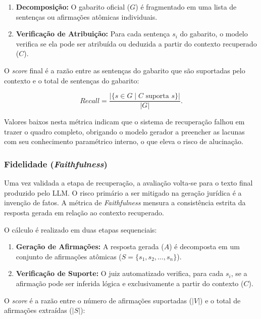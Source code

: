 \begin{enumerate}
  \item \textbf{Decomposição:} O gabarito oficial ($G$) é fragmentado em uma lista de sentenças ou afirmações atômicas individuais.
  \item \textbf{Verificação de Atribuição:} Para cada sentença $s_i$ do gabarito, o modelo verifica se ela pode ser atribuída ou deduzida a partir do contexto recuperado ($C$).
\end{enumerate}

O \textit{score} final é a razão entre as sentenças do gabarito que são suportadas pelo contexto e o total de sentenças do gabarito:

\begin{equation}
  Recall = \frac{|\{s \in G \mid C \text{ suporta } s\}|}{|G|}.
\end{equation}

Valores baixos nesta métrica indicam que o sistema de recuperação falhou em trazer o quadro completo, obrigando o modelo gerador a preencher as lacunas com seu conhecimento paramétrico interno, o que eleva o risco de alucinação.

\subsubsection{Fidelidade (\textit{Faithfulness})}

Uma vez validada a etapa de recuperação, a avaliação volta-se para o texto final produzido pelo LLM. O risco primário a ser mitigado na geração jurídica é a invenção de fatos. A métrica de \textit{Faithfulness} mensura a consistência estrita da resposta gerada em relação ao contexto recuperado.

O cálculo é realizado em duas etapas sequenciais:

\begin{enumerate}
  \item \textbf{Geração de Afirmações:} A resposta gerada ($A$) é decomposta em um conjunto de afirmações atômicas ($S = \{s_1, s_2, \dots, s_n\}$).
  \item \textbf{Verificação de Suporte:} O juiz automatizado verifica, para cada $s_i$, se a afirmação pode ser inferida lógica e exclusivamente a partir do contexto ($C$).
\end{enumerate}

O \textit{score} é a razão entre o número de afirmações suportadas ($|V|$) e o total de afirmações extraídas ($|S|$):

